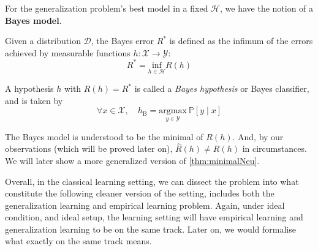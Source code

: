 For the generalization problem's best model in a fixed $\mathcal{H}$, we have the notion of a \textbf{Bayes model}. %
\begin{definition}
    Given a distribution $\mathcal{D}$, the Bayes error $R^{*}$ is defined as the infimum of the errors achieved by measurable functions $h:\mathcal{X}\to \mathcal{Y}$: 
    \begin{equation}
        R^{*}=\underset{h\in \mathcal{H}}{\mathrm{inf}}R(h)
    \end{equation}
\end{definition}
\begin{definition}
    A hypothesis $h$ with $R(h)=R^{*}$ is called a \textit{Bayes hypothesis} or Bayes classifier, and is taken by \begin{equation}
        \forall x\in \mathcal{X}, \quad h_{\mathrm{B}}=\underset{y\in \mathcal{Y}}{\mathrm{argmax}}\:\mathbb{P}[y\mid x]
    \end{equation} 
\end{definition}

The Bayes model is understood to be the minimal of $R(h)$. And, by our observations (which will be proved later on), $\hat{R}(h)\neq R(h)$ in circumstances. We will later show a more generalized version of \ref{thm:minimalNeu}. 

Overall, in the classical learning setting, we can dissect the problem into what constitute the following cleaner version of the setting, includes both the generalization learning and empirical learning problem. Again, under ideal condition, and ideal setup, the learning setting will have empirical learning and generalization learning to be on the same track. Later on, we would formalise what exactly on the same track means. 

